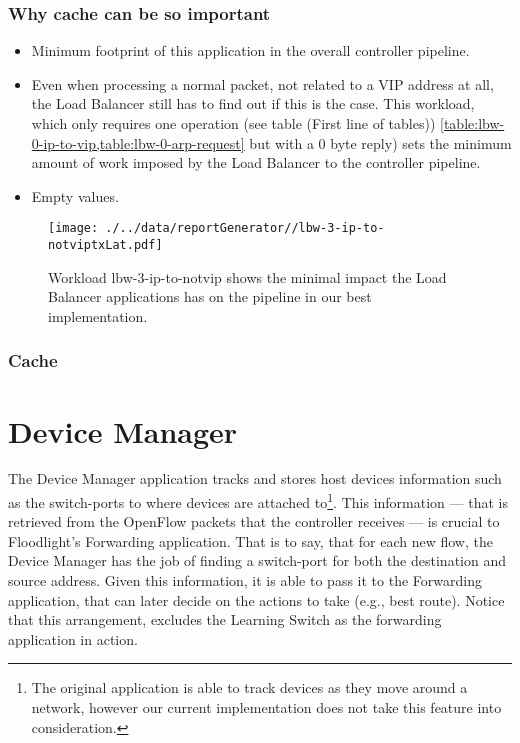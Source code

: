 \subsubsection{Why cache can be so important}



\begin{itemize}
\item Minimum footprint of this application in the overall controller
  pipeline. 
\item Even when processing a normal packet, not related to a VIP address at
all, the Load Balancer still has to find out if this is the case. This
workload, which only requires one operation (see table (First line of tables))
\ref{table:lbw-0-ip-to-vip,table:lbw-0-arp-request} but with  a 0 byte
reply) sets the minimum amount of work imposed by
the Load Balancer to the controller pipeline. 
\item Empty values. 

\end{itemize}



\begin{figure}[ht]
\centering
\texttt{[image: ./../data/reportGenerator//lbw-3-ip-to-notviptxLat.pdf]}
\caption[Minimum impact of Load Balancer in the pipeline.]{Workload
  lbw-3-ip-to-notvip shows the minimal impact the Load Balancer
  applications has on the pipeline in our best implementation.}
\end{figure}


\subsubsection{Cache}

\section{Device Manager}
\label{sec:feasibility:dm}
\glsresetall


The Device Manager application tracks and stores host devices
information such as the switch-ports to where devices are
attached to\footnote{The original application is able to track devices as
  they move around a network, however our current implementation does
  not take this feature into consideration.}. This information ---
that is retrieved from the OpenFlow packets that the controller receives --- is crucial to
Floodlight’s Forwarding application. That is to say, that for  each new flow, the Device
Manager has the job of finding a switch-port for both the destination
and source address. Given this information, it is able to pass it to
the Forwarding application, that can later decide on the actions to
take (e.g., best route). Notice that this arrangement, excludes the
Learning Switch as the  forwarding application in action. 

